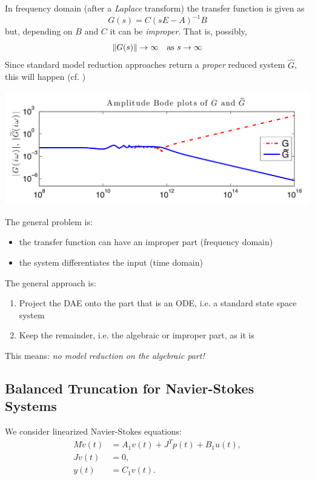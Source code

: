 	In frequency domain (after a \emph{Laplace} transform) the transfer function is given as
	$$G(s) = C(sE-A)^{-1}B$$
	but, depending on $B$ and $C$ it can be \emph{improper}. That is, possibly,
	$$\lVert G(s) \rVert \to \infty \quad\text{as }s\to \infty$$
	Since standard model reduction approaches return a \emph{proper} reduced system $\hat G$, this will happen (cf. \cite{morGugSW13})

		\includegraphics[width=\textwidth]{GugSW-properimproper}

	The general problem is:
	\begin{itemize}
		\item the transfer function can have an improper part (frequency domain)
		\item the system differentiates the input (time domain)
	\end{itemize}

	The general approach is:
	\begin{enumerate}
		\item Project the DAE onto the part that is an ODE, i.e. a standard state space system
		\item Keep the remainder, i.e. the algebraic or improper part, as it is 
	\end{enumerate}
	This means: \emph{no model reduction on the algebraic part!}

\subsection{Balanced Truncation for Navier-Stokes Systems}
  We consider linearized Navier-Stokes equations:
	\begin{align*}
		M \dot v(t) &=  A_1v(t) + J^T p(t) + B_1 u(t), \\
		Jv(t) &= 0, \\
		y(t) &= C_1v(t).
	\end{align*}

